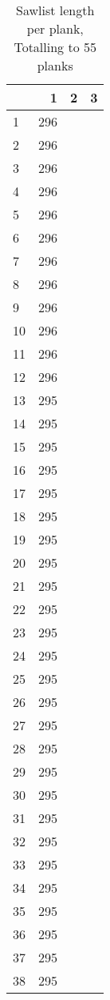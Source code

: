 \begin{table}[h!]
\centering
\caption{Sawlist length per plank, Totalling to 55 planks}
\begin{tabular}{lrrr}
\toprule
{} &   1 &  2 &  3 \\
\midrule
1  & 296 &    &    \\
2  & 296 &    &    \\
3  & 296 &    &    \\
4  & 296 &    &    \\
5  & 296 &    &    \\
6  & 296 &    &    \\
7  & 296 &    &    \\
8  & 296 &    &    \\
9  & 296 &    &    \\
10 & 296 &    &    \\
11 & 296 &    &    \\
12 & 296 &    &    \\
13 & 295 &    &    \\
14 & 295 &    &    \\
15 & 295 &    &    \\
16 & 295 &    &    \\
17 & 295 &    &    \\
18 & 295 &    &    \\
19 & 295 &    &    \\
20 & 295 &    &    \\
21 & 295 &    &    \\
22 & 295 &    &    \\
23 & 295 &    &    \\
24 & 295 &    &    \\
25 & 295 &    &    \\
26 & 295 &    &    \\
27 & 295 &    &    \\
28 & 295 &    &    \\
29 & 295 &    &    \\
30 & 295 &    &    \\
31 & 295 &    &    \\
32 & 295 &    &    \\
33 & 295 &    &    \\
34 & 295 &    &    \\
35 & 295 &    &    \\
36 & 295 &    &    \\
37 & 295 &    &    \\
38 & 295 &    &    \\

\end{tabular}
\end{table}
